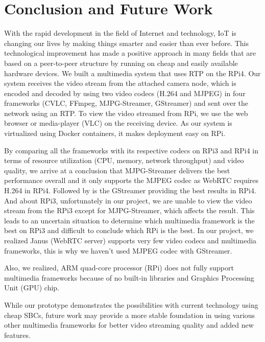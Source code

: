 \section{Conclusion and Future Work}

With the rapid development in the field of Internet and technology, IoT is changing our lives by making things smarter and easier than ever before. This technological improvement has made a positive approach in many fields that are based on a peer-to-peer structure by running on cheap and easily available hardware devices. We built a multimedia system that uses RTP on the RPi4. Our system receives the video stream from the attached camera node, which is encoded and decoded by using two video codecs (H.264 and MJPEG) in four frameworks (CVLC, FFmpeg, MJPG-Streamer, GStreamer) and sent over the network using an RTP. To view the video streamed from RPi, we use the web browser or media-player (VLC) on the receiving device. As our system is virtualized using Docker containers, it makes deployment easy on RPi. \par

By comparing all the frameworks with its respective codecs on RPi3 and RPi4 in terms of resource utilization (CPU, memory, network throughput) and video quality, we arrive at a conclusion that MJPG-Streamer delivers the best performance overall and it only supports the MJPEG codec as WebRTC requires H.264 in RPi4. Followed by is the GStreamer providing the best results in RPi4. And about RPi3, unfortunately in our project, we are unable to view the video stream from the RPi3 except for MJPG-Streamer, which affects the result. This leads to an uncertain situation to determine which multimedia framework is the best on RPi3 and difficult to conclude which RPi is the best. In our project, we realized Janus (WebRTC server) supports very few video codecs and multimedia frameworks, this is why we haven't used MJPEG codec with GStreamer. \par 

Also, we realized, ARM quad-core processor (RPi) does not fully support multimedia frameworks because of no built-in libraries and Graphics Processing Unit (GPU) chip. \par

While our prototype demonstrates the possibilities with current technology using cheap SBCs, future work may provide a more stable foundation in using various other multimedia frameworks for better video streaming quality and added new features.